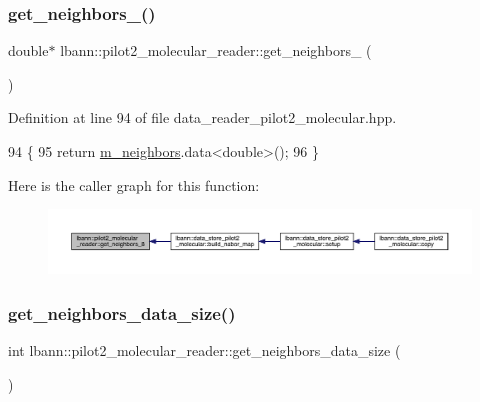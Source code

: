 \subsubsection{\texorpdfstring{get\+\_\+neighbors\+\_()}{get\_neighbors\_8()}}
{\footnotesize\ttfamily double$\ast$ lbann\+::pilot2\+\_\+molecular\+\_\+reader\+::get\+\_\+neighbors\+\_ (\begin{DoxyParamCaption}{ }\end{DoxyParamCaption})\hspace{0.3cm}{\ttfamily [inline]}}



Definition at line 94 of file data\+\_\+reader\+\_\+pilot2\+\_\+molecular.\+hpp.


\begin{DoxyCode}
94                              \{
95     \textcolor{keywordflow}{return} \hyperlink{classlbann_1_1pilot2__molecular__reader_a0d8dc24b8ea66352a4d45a157b3a3c04}{m\_neighbors}.data<\textcolor{keywordtype}{double}>();
96   \}
\end{DoxyCode}
Here is the caller graph for this function\+:\nopagebreak
\begin{figure}[H]
\begin{center}
\leavevmode
\includegraphics[width=350pt]{classlbann_1_1pilot2__molecular__reader_a9553eeece9aa1658cdc986b3ef803dea_icgraph}
\end{center}
\end{figure}
\mbox{\label{classlbann_1_1pilot2__molecular__reader_a628d96b642e913550316076a11ba5285}} 
\subsubsection{\texorpdfstring{get\+\_\+neighbors\+\_\+data\+\_\+size()}{get\_neighbors\_data\_size()}}
{\footnotesize\ttfamily int lbann\+::pilot2\+\_\+molecular\+\_\+reader\+::get\+\_\+neighbors\+\_\+data\+\_\+size (\begin{DoxyParamCaption}{ }\end{DoxyParamCaption})\hspace{0.3cm}{\ttfamily [inline]}}



